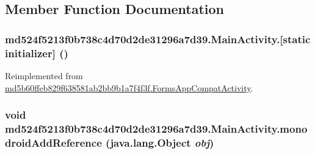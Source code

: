 \subsection{Member Function Documentation}
\hypertarget{classmd524f5213f0b738c4d70d2de31296a7d39_1_1_main_activity_1d35ea6707bf279c2c796c89d68b13ae}{
\subsubsection[{[static initializer]}]{\setlength{\rightskip}{0pt plus 5cm}md524f5213f0b738c4d70d2de31296a7d39.MainActivity.\mbox{[}static initializer\mbox{]} ()}}
\label{classmd524f5213f0b738c4d70d2de31296a7d39_1_1_main_activity_1d35ea6707bf279c2c796c89d68b13ae}




Reimplemented from \hyperlink{classmd5b60ffeb829f638581ab2bb9b1a7f4f3f_1_1_forms_app_compat_activity_6a161f889b5107b95ec5f85d90689265}{md5b60ffeb829f638581ab2bb9b1a7f4f3f.FormsAppCompatActivity}.\hypertarget{classmd524f5213f0b738c4d70d2de31296a7d39_1_1_main_activity_c001ac4bc7c7713ba23345add551eb87}{
\subsubsection[{monodroidAddReference}]{\setlength{\rightskip}{0pt plus 5cm}void md524f5213f0b738c4d70d2de31296a7d39.MainActivity.monodroidAddReference (java.lang.Object {\em obj})}}
\label{classmd524f5213f0b738c4d70d2de31296a7d39_1_1_main_activity_c001ac4bc7c7713ba23345add551eb87}




